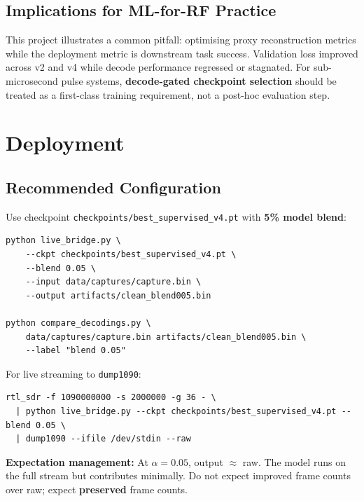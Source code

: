 \documentclass[11pt,a4paper]{article}
\begin{document}
\subsection{Implications for ML-for-RF Practice}

This project illustrates a common pitfall: optimising proxy reconstruction
metrics while the deployment metric is downstream task success. Validation loss
improved across v2 and v4 while decode performance regressed or stagnated. For
sub-microsecond pulse systems, \textbf{decode-gated checkpoint selection}
should be treated as a first-class training requirement, not a post-hoc
evaluation step.

\section{Deployment}

\subsection{Recommended Configuration}

Use checkpoint \texttt{checkpoints/best\_supervised\_v4.pt} with \textbf{5\%
model blend}:

\begin{lstlisting}[style=cli]
python live_bridge.py \
    --ckpt checkpoints/best_supervised_v4.pt \
    --blend 0.05 \
    --input data/captures/capture.bin \
    --output artifacts/clean_blend005.bin

python compare_decodings.py \
    data/captures/capture.bin artifacts/clean_blend005.bin \
    --label "blend 0.05"
\end{lstlisting}

For live streaming to \texttt{dump1090}:

\begin{lstlisting}[style=cli]
rtl_sdr -f 1090000000 -s 2000000 -g 36 - \
  | python live_bridge.py --ckpt checkpoints/best_supervised_v4.pt --blend 0.05 \
  | dump1090 --ifile /dev/stdin --raw
\end{lstlisting}

\textbf{Expectation management:} At $\alpha=0.05$, output $\approx$ raw. The
model runs on the full stream but contributes minimally. Do not expect improved
frame counts over raw; expect \textbf{preserved} frame counts.
\end{document}
